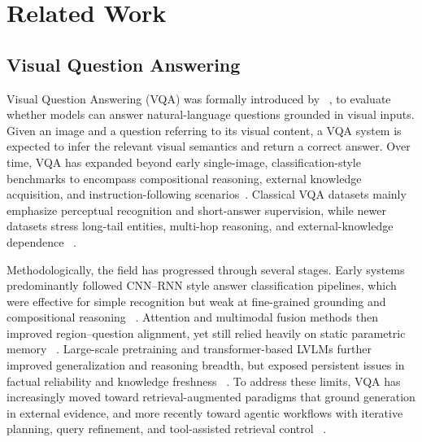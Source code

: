 \documentclass{article} %
\begin{document}
\clearpage
\section{Related Work}
\subsection{Visual Question Answering}
Visual Question Answering (VQA) was formally introduced by ~\citep{antol2015vqa}, to evaluate whether models can answer natural-language questions grounded in visual inputs. 
Given an image and a question referring to its visual content, a VQA system is expected to infer the relevant visual semantics and return a correct answer. 
Over time, VQA has expanded beyond early single-image, classification-style benchmarks to encompass compositional reasoning, external knowledge acquisition, and instruction-following scenarios~\citep{antol2015vqa, hudson2019gqa}.
Classical VQA datasets mainly emphasize perceptual recognition and short-answer supervision, while newer datasets stress long-tail entities, multi-hop reasoning, and external-knowledge dependence ~\citep{marino2019ok, schwenk2022okvqa}. 

Methodologically, the field has progressed through several stages. 
Early systems predominantly followed CNN--RNN style answer classification pipelines, which were effective for simple recognition but weak at fine-grained grounding and compositional reasoning ~\citep{kazemi2017show}. 
Attention and multimodal fusion methods then improved region--question alignment, yet still relied heavily on static parametric memory ~\citep{lu2016hierarchical}. 
Large-scale pretraining and transformer-based LVLMs further improved generalization and reasoning breadth, but exposed persistent issues in factual reliability and knowledge freshness ~\citep{chen2019uniter}. 
To address these limits, VQA has increasingly moved toward retrieval-augmented paradigms that ground generation in external evidence, and more recently toward agentic workflows with iterative planning, query refinement, and tool-assisted retrieval control ~\citep{abootorabi2025ask,mei2025survey}.

\end{document}
